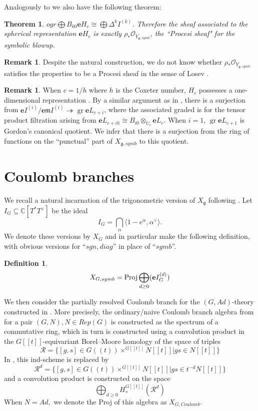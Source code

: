 \documentclass{amsart}
\numberwithin{equation}{section}
\newtheorem{theorem}[lemma]{Theorem}%
\theoremstyle{definition}
\newtheorem{remark}[lemma]{Remark}%
\newtheorem{definition}[lemma]{Definition}%
\DeclareMathOperator{\Proj}{\mathrm{Proj}}
\DeclareMathOperator{\gr}{gr}
\newcommand{\cO}{\mathcal{O}}
\newcommand{\cR}{\mathcal{R}}
\newcommand{\fm}{\mathfrak{m}}
\newcommand{\fg}{\mathfrak{g}}
\newcommand{\C}{{\mathbb C}}
\newcommand{\e}{\mathbf{e}}
\begin{document}


Analogously to \cite[6.5. and Corollary 6.22.]{GS1} we also have the following theorem:
\begin{theorem}
$ogr \bigoplus B_{k0}\e H_c\cong \bigoplus \Delta^k I^{(k)}$. Therefore the sheaf associated to the spherical representation $\e H_c$ is exactly $\rho_*\cO_{Y_{\fg,symb}}$, the ``Procesi sheaf" for the symbolic blowup.
\end{theorem}
\begin{remark}
Despite the natural construction, we do not know whether $\rho_*\cO_{Y_{\fg,symb}}$ satisfies the properties to be a Procesi sheaf in the sense of Losev \cite{Losev}.
\end{remark}
\begin{remark}
When $c=1/h$ where $h$ is the Coxeter number, $H_c$ possesses a one-dimensional representation \cite{BEG}. By a similar argument as in \cite{GS2}, there is a surjection from $ \e I^{(i)}/\e \fm I^{(i)}\twoheadrightarrow \gr \e L_{c+i}$, where the associated graded is for the tensor product filtration arising from $\e L_{c+ih}\cong B_{i0}\otimes_{U_c} \e L_{c}$. When $i=1$, $\gr \e L_{c+1}$ is Gordon's canonical quotient. We infer that there is a surjection from the ring of functions on the ``punctual'' part of $X_{\fg,symb}$ to this quotient.
\end{remark}


\section{Coulomb branches}
\label{sec:coulomb}
We recall a natural incarnation of the trigonometric version of $X_\fg$ following \cite{GKO}. Let $I_G\subseteq \C[T^*T^\vee]$ be the ideal $$I_G=\bigcap_\alpha \langle 1-e^{\alpha}, \alpha^\vee\rangle.$$
We denote these versions by $X_G$ and in particular make the following definition, with obvious versions for ``$sgn, diag$'' in place of ``$symb$''.
\begin{definition}
    $$X_{G,symb}=\Proj \bigoplus_{d\geq 0} ({\bf e} I_G^{(d)})$$
\end{definition}
We then consider the partially resolved Coulomb branch for the $(G, Ad)$-theory constructed in \cite[Section 3]{GKO}. More precisely, the ordinary/naive Coulomb branch algebra from \cite{BFN} for a pair $(G,N), N\in Rep(G)$ is constructed as the spectrum of a commutative ring, which in turn is constructed using a convolution product in the $G[[t]]$-equivariant Borel--Moore homology of the space of triples 
$$\cR=\{[g,s]\in G((t))\times^{G[[t]]} N[[t]]|gs\in N[[t]]\}$$ 
In \cite{GKO}, this ind-scheme is replaced by $$\cR^d=\{[g,s]\in G((t))\times^{G[[t]]} N[[t]]|gs\in t^{-d}N[[t]]\}$$ and a convolution product is constructed on the space 
$$\bigoplus_{d\geq 0} H^{G[[t]]}_*(\cR^d)$$
When $N=Ad,$ we denote the Proj of this algebra as $X_{G,Coulomb}$.
\end{document}
